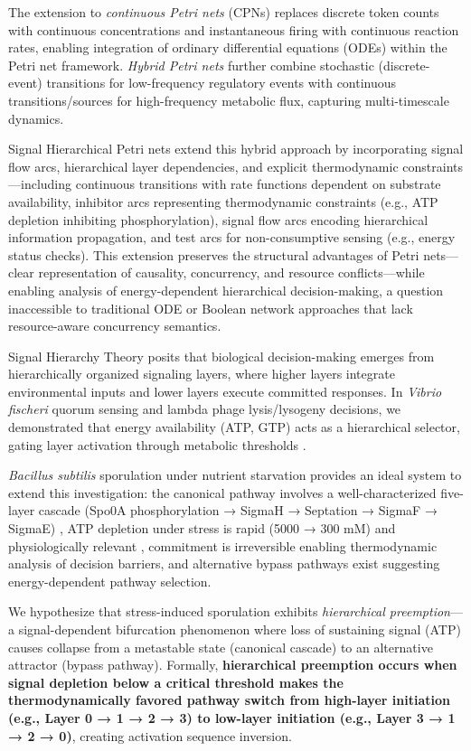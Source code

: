 \documentclass[twocolumn,11pt]{article}
\begin{document}
The extension to \textit{continuous Petri nets} (CPNs) \citep{david1992, baldazzi2010} replaces discrete token counts with continuous concentrations and instantaneous firing with continuous reaction rates, enabling integration of ordinary differential equations (ODEs) within the Petri net framework. \textit{Hybrid Petri nets} further combine stochastic (discrete-event) transitions for low-frequency regulatory events with continuous transitions/sources for high-frequency metabolic flux, capturing multi-timescale dynamics.

Signal Hierarchical Petri nets extend this hybrid approach by incorporating signal flow arcs, hierarchical layer dependencies, and explicit thermodynamic constraints—including continuous transitions with rate functions dependent on substrate availability, inhibitor arcs representing thermodynamic constraints (e.g., ATP depletion inhibiting phosphorylation), signal flow arcs encoding hierarchical information propagation, and test arcs for non-consumptive sensing (e.g., energy status checks). This extension preserves the structural advantages of Petri nets—clear representation of causality, concurrency, and resource conflicts—while enabling analysis of energy-dependent hierarchical decision-making, a question inaccessible to traditional ODE or Boolean network approaches that lack resource-aware concurrency semantics.

Signal Hierarchy Theory \citep{eugenio2025} posits that biological decision-making emerges from hierarchically organized signaling layers, where higher layers integrate environmental inputs and lower layers execute committed responses. In \textit{Vibrio fischeri} quorum sensing and lambda phage lysis/lysogeny decisions, we demonstrated that energy availability (ATP, GTP) acts as a hierarchical selector, gating layer activation through metabolic thresholds \citep{eugenio2025}.

\textit{Bacillus subtilis} sporulation under nutrient starvation provides an ideal system to extend this investigation: the canonical pathway involves a well-characterized five-layer cascade (Spo0A phosphorylation → SigmaH → Septation → SigmaF → SigmaE) \citep{errington1993, piggot2004}, ATP depletion under stress is rapid (5000 → 300 mM) and physiologically relevant \citep{lopez2009}, commitment is irreversible enabling thermodynamic analysis of decision barriers, and alternative bypass pathways exist suggesting energy-dependent pathway selection.

We hypothesize that stress-induced sporulation exhibits \textit{hierarchical preemption}—a signal-dependent bifurcation phenomenon where loss of sustaining signal (ATP) causes collapse from a metastable state (canonical cascade) to an alternative attractor (bypass pathway). Formally, \textbf{hierarchical preemption occurs when signal depletion below a critical threshold makes the thermodynamically favored pathway switch from high-layer initiation (e.g., Layer 0 → 1 → 2 → 3) to low-layer initiation (e.g., Layer 3 → 1 → 2 → 0)}, creating activation sequence inversion.
\end{document}

